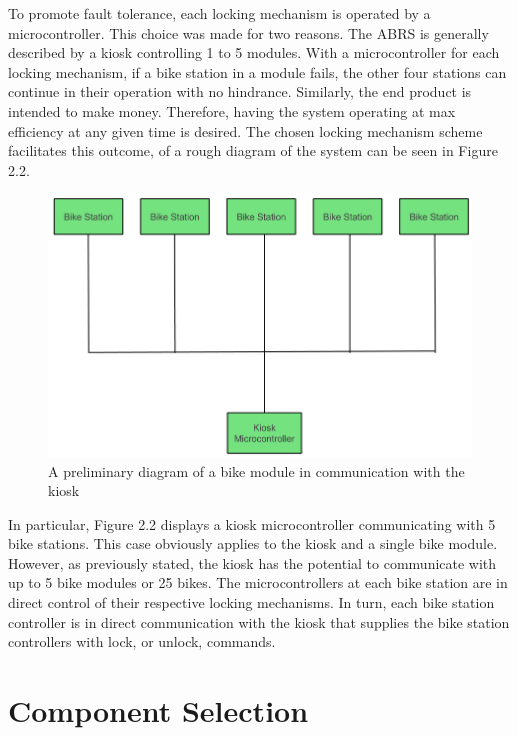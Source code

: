 \documentclass[11pt,a4paper,onesides]{report}
\begin{document}
To promote fault tolerance, each locking mechanism is operated by a microcontroller.  This choice was made for two reasons.  The ABRS is generally described by a kiosk controlling 1 to 5 modules.  With a microcontroller for each locking mechanism, if a bike station in a module fails, the other four stations can continue in their operation with no hindrance.  Similarly, the end product is intended to make money.  Therefore, having the system operating at max efficiency at any given time is desired.  The chosen locking mechanism scheme facilitates this outcome, of a rough diagram of the system can be seen in Figure 2.2. 

\begin{figure}[h]
	\begin{center}
		\includegraphics[scale = 0.6]{module-block-diagram}
	\end{center}
\caption{A preliminary diagram of a bike module in communication with the kiosk}

\end{figure}

In particular, Figure 2.2 displays a kiosk microcontroller communicating with 5 bike stations.  This case obviously applies to the kiosk and a single bike module.  However, as previously stated, the kiosk has the potential to communicate with up to 5 bike modules or 25 bikes.  The microcontrollers at each bike station are in direct control of their respective locking mechanisms.  In turn, each bike station controller is in direct communication with the kiosk that supplies the bike station controllers with lock, or unlock, commands.


\chapter{Component Selection}
\end{document}
